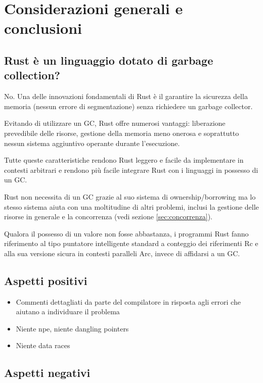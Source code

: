 \newpage
\section{Considerazioni generali e conclusioni}

\subsection{Rust è un linguaggio dotato di garbage collection?}

No. Una delle innovazioni fondamentali di Rust è il garantire la sicurezza
della memoria (nessun errore di segmentazione) senza richiedere un garbage
collector.

Evitando di utilizzare un GC, Rust offre numerosi vantaggi: liberazione
prevedibile delle risorse, gestione della memoria meno onerosa e soprattutto
nessun sistema aggiuntivo operante durante l’esecuzione.

Tutte queste caratteristiche rendono Rust leggero e facile da implementare in
contesti arbitrari e rendono più facile integrare Rust con i linguaggi in
possesso di un GC.

Rust non necessita di un GC grazie al suo sistema di ownership/borrowing ma lo
stesso sistema aiuta con una moltitudine di altri problemi, inclusi la gestione
delle risorse in generale e la concorrenza (vedi sezione \ref{sec:concorrenza}).

Qualora il possesso di un valore non fosse abbastanza, i programmi Rust fanno
riferimento al tipo puntatore intelligente standard a conteggio dei riferimenti
Rc e alla sua versione sicura in contesti paralleli Arc, invece di affidarsi a
un GC.

\subsection{Aspetti positivi}

\begin{itemize}
  \item Commenti dettagliati da parte del compilatore in risposta agli errori
che aiutano a individuare il problema
  \item Niente npe, niente dangling pointers
  \item Niente data races
\end{itemize}

\subsection{Aspetti negativi}

